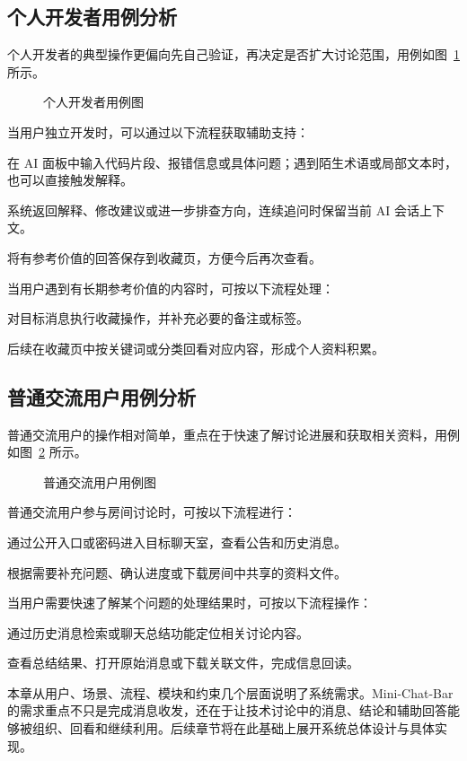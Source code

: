 \subsection{个人开发者用例分析}

个人开发者的典型操作更偏向先自己验证，再决定是否扩大讨论范围，用例如图~\ref{fig:3-4} 所示。

\begin{figure}[H]
\centering
{}
\caption{个人开发者用例图}
\label{fig:3-4}
\end{figure}


当用户独立开发时，可以通过以下流程获取辅助支持：
\begin{usecaselist}
\item 在 AI 面板中输入代码片段、报错信息或具体问题；遇到陌生术语或局部文本时，也可以直接触发解释。
\item 系统返回解释、修改建议或进一步排查方向，连续追问时保留当前 AI 会话上下文。
\item 将有参考价值的回答保存到收藏页，方便今后再次查看。
\end{usecaselist}


当用户遇到有长期参考价值的内容时，可按以下流程处理：
\begin{usecaselist}
\item 对目标消息执行收藏操作，并补充必要的备注或标签。
\item 后续在收藏页中按关键词或分类回看对应内容，形成个人资料积累。
\end{usecaselist}

\subsection{普通交流用户用例分析}

普通交流用户的操作相对简单，重点在于快速了解讨论进展和获取相关资料，用例如图~\ref{fig:3-5} 所示。

\begin{figure}[H]
\centering
{}
\caption{普通交流用户用例图}
\label{fig:3-5}
\end{figure}


普通交流用户参与房间讨论时，可按以下流程进行：
\begin{usecaselist}
\item 通过公开入口或密码进入目标聊天室，查看公告和历史消息。
\item 根据需要补充问题、确认进度或下载房间中共享的资料文件。
\end{usecaselist}


当用户需要快速了解某个问题的处理结果时，可按以下流程操作：
\begin{usecaselist}
\item 通过历史消息检索或聊天总结功能定位相关讨论内容。
\item 查看总结结果、打开原始消息或下载关联文件，完成信息回读。
\end{usecaselist}

本章从用户、场景、流程、模块和约束几个层面说明了系统需求。Mini-Chat-Bar 的需求重点不只是完成消息收发，还在于让技术讨论中的消息、结论和辅助回答能够被组织、回看和继续利用。后续章节将在此基础上展开系统总体设计与具体实现。
